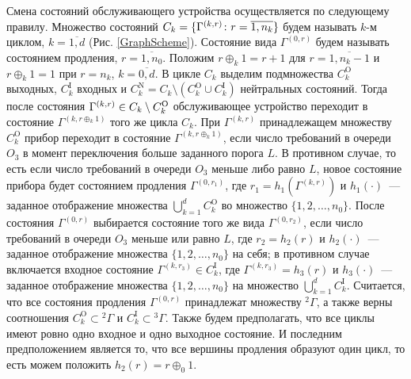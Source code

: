 \documentclass[11pt]{ubs}
\newcommand*{\hm}[1]{#1\nobreak\discretionary{}%
	{\hbox{$\mathsurround=0pt #1$}}{}}%
\begin{document}
Смена состояний обслуживающего устройства осуществляется по следующему правилу. Множество состояний $C_k = \{\Gamma^{(k,r)} \colon r =\nobreak\discretionary{}{\hbox{$\mathsurround=0pt =$}}{}\overline{1,n_k}\}$ будем называть $k$-м циклом, $k=\overline{1,d}$ (Рис. \ref{GraphScheme}). Состояние вида $\Gamma^{(0,r)}$ будем называть состоянием продления, $r=\overline{1,n_0}$. Положим $r \oplus_k 1 = r+1$ для $r=\overline{1,n_k-1}$ и $r \oplus_k 1 = 1$ при $r=n_k$, $k = \overline{0,d}$. В цикле $C_k$ выделим подмножества $C_k^{\mathrm{O}}$ выходных, $C_k^{\mathrm{I}}$ входных и $C_k^{\mathrm{N}} = C_k \setminus (C_k^{\mathrm{O}} \cup C_k^{\mathrm{I}})$ нейтральных состояний. Тогда после состояния $\Gamma^{(k,r)} \hm\in C_k\setminus C_k^{\mathrm{O}}$ обслуживающее устройство переходит в состояние $\Gamma^{(k,r \oplus_k 1)}$ того же цикла $C_k$. При $\Gamma^{(k,r)}$ принадлежащем множеству $C_k^{\mathrm{O}}$ прибор переходит в состояние $\Gamma^{(k,r \oplus_k 1)}$, если число требований в очереди $O_3$ в момент переключения больше заданного порога $L$. В противном случае, то есть если число требований в очереди $O_3$ меньше либо равно $L$, новое состояние прибора будет состоянием продления $\Gamma^{(0,r_1)}$, где $r_1=h_1(\Gamma^{(k,r)})$ и $h_1(\cdot)$~--- заданное отображение множества $\bigcup\limits_{k=1}^d C_k^{\mathrm{O}}$ во множество $\{1,2,\ldots, n_0\}$. После состояния $\Gamma^{(0,r)}$ выбирается состояние того же вида $\Gamma^{(0,r_2)}$, если число требований в очереди $O_3$ меньше или равно $L$, где $r_2=h_2(r)$ и $h_2(\cdot)$~--- заданное отображение множества $\{1,2, \ldots, n_0\}$ на себя; в противном случае включается входное состояние $\Gamma^{(k,r_3)} \in C_k^{\mathrm{I}}$, где $\Gamma^{(k,r_3)}=h_3(r)$ и $h_3(\cdot)$~--- заданное отображение множества $\{1,2, \ldots, n_0\}$ на множество  $\bigcup\limits_{k=1}^d C_k^{\mathrm{I}}$. Считается, что все состояния продления $\Gamma^{(0,r)}$ принадлежат множеству ${}^2 \Gamma$, а также верны соотношения $C_k^\mathrm{O}\subset {}^2 \Gamma$ и $C_k^\mathrm{I}\subset {}^3 \Gamma$. Также будем предполагать, что все циклы имеют ровно одно входное и одно выходное состояние. И последним предположением является то, что все вершины продления образуют один цикл, то есть можем положить $h_2(r)=r\oplus_0 1$.


\end{document}
